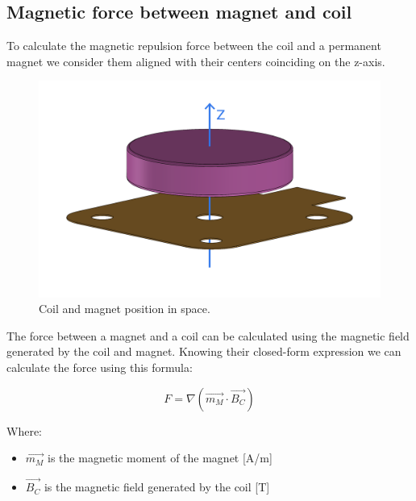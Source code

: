 \subsection{Magnetic force between magnet and coil}

\begin{samepage}
    To calculate the magnetic repulsion force between the coil and a permanent magnet we consider them aligned with their centers coinciding on the z-axis.
    \nopagebreak

    \begin{figure}[H]
        \centering
        \includegraphics[width=0.5\columnwidth]{Chapters/Chapter2/Modelling_of_Entire_System/Figures/coil_magnet.png} 
        \caption[Coil-Magnet position]{Coil and magnet position in space.}
        \label{fig: Coil-Magnet_position}
    \end{figure}
\end{samepage}

\begin{samepage}
    The force between a magnet and a coil can be calculated using the magnetic field generated by the coil and magnet.
    Knowing their closed-form expression we can calculate the force using this formula:
    \nopagebreak

    \begin{equation*}
        F = \nabla (\overrightarrow{m_M} \cdot \overrightarrow{B_C}) %
    \end{equation*}
    \nopagebreak

    Where: 
    \begin{itemize}
        \item $\overrightarrow{m_M}$ is the magnetic moment of the magnet [A/m]
        \item $\overrightarrow{B_C}$ is the magnetic field generated by the coil [T]
    \end{itemize}
\end{samepage}

